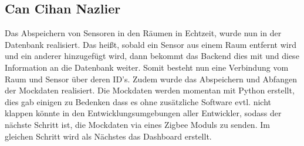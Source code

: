 \documentclass[]{article}
\begin{document}
\subsection{Can Cihan Nazlier}
Das Abspeichern von Sensoren in den Räumen in Echtzeit, wurde nun in der Datenbank realisiert. Das heißt, sobald ein Sensor aus einem Raum entfernt wird und ein anderer hinzugefügt wird, dann bekommt das Backend dies mit und diese Information an die Datenbank weiter. Somit besteht nun eine Verbindung vom Raum und Sensor über deren ID's. Zudem wurde das Abspeichern und Abfangen der Mockdaten realisiert.
Die Mockdaten werden momentan mit Python erstellt, dies gab einigen zu Bedenken dass es ohne zusätzliche Software evtl. nicht klappen könnte in den Entwicklungsumgebungen
aller Entwickler, sodass der nächste Schritt ist, die Mockdaten via eines Zigbee Moduls zu senden. Im gleichen Schritt wird als Nächstes das Dashboard erstellt.

\printbibliography
\end{document}
